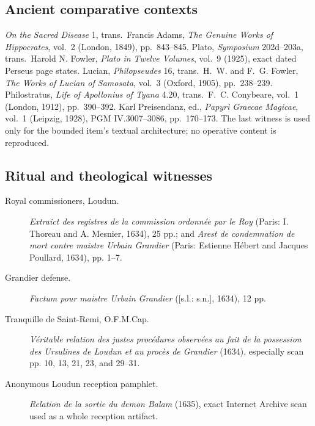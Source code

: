 \subsection{Ancient comparative contexts}

\emph{On the Sacred Disease} 1, trans.\ Francis Adams,
\emph{The Genuine Works of Hippocrates}, vol.~2 (London, 1849),
pp.~843--845. Plato, \emph{Symposium} 202d--203a, trans.\ Harold N. Fowler,
\emph{Plato in Twelve Volumes}, vol.~9 (1925), exact dated Perseus page
states. Lucian, \emph{Philopseudes} 16, trans.\ H.~W. and F.~G. Fowler,
\emph{The Works of Lucian of Samosata}, vol.~3 (Oxford, 1905),
pp.~238--239. Philostratus, \emph{Life of Apollonius of Tyana} 4.20,
trans.\ F.~C. Conybeare, vol.~1 (London, 1912), pp.~390--392.
Karl Preisendanz, ed., \emph{Papyri Graecae Magicae}, vol.~1 (Leipzig,
1928), PGM IV.3007--3086, pp.~170--173. The last witness is used only for
the bounded item's textual architecture; no operative content is reproduced.

\subsection{Ritual and theological witnesses}

\begin{description}
  \item[Royal commissioners, Loudun.]
    \emph{Extraict des registres de la commission ordonnée par le Roy}
    (Paris: I. Thoreau and A. Mesnier, 1634), 25 pp.; and
    \emph{Arest de condemnation de mort contre maistre Urbain Grandier}
    (Paris: Estienne Hébert and Jacques Poullard, 1634), pp. 1--7.
  \item[Grandier defense.]
    \emph{Factum pour maistre Urbain Grandier} ([s.l.: s.n.], 1634),
    12 pp.
  \item[Tranquille de Saint-Remi, O.F.M.Cap.]
    \emph{Véritable relation des justes procédures observées au fait de la
    possession des Ursulines de Loudun et au procès de Grandier} (1634),
    especially scan pp. 10, 13, 21, 23, and 29--31.
  \item[Anonymous Loudun reception pamphlet.]
    \emph{Relation de la sortie du demon Balam} (1635), exact
    Internet Archive scan used as a whole reception artifact.
\end{description}

